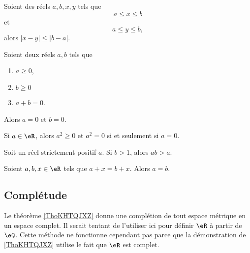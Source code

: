 \begin{lemma}        \label{LEMooEGYLooCGrDrl}
	Soient des réels \( a,b,x,y\) tels que
	\begin{equation}
		a\leq x\leq b
	\end{equation}
	et
	\begin{equation}
		a\leq y\leq b,
	\end{equation}
	alors \( | x-y |\leq | b-a |\).
\end{lemma}

\begin{lemma}       \label{LEMooTPLUooXiCZHJ}
	Soient deux réels \( a,b\) tels que
	\begin{enumerate}
		\item
		      \( a\geq 0\),
		\item
		      \( b\geq 0\)
		\item
		      \( a+b=0\).
	\end{enumerate}
	Alors \( a=0\) et \( b=0\).
\end{lemma}

\begin{lemma}       \label{LEMooNLGSooSGdvAo}
	Si \( a\in \eR\), alors \( a^2\geq 0\) et \( a^2=0\) si et seulement si \( a=0\).
\end{lemma}

\begin{lemma}       \label{LEMooVXAXooNhxtSU}
	Soit un réel strictement positif \( a\). Si \( b>1\), alors \( ab>a\).
\end{lemma}


\begin{lemma}       \label{LEMooFQMVooDNaTDT}
    Soient \( a,b,x\in \eR\) tels que \( a+x=b+x\). Alors \( a=b\).
\end{lemma}


\subsection{Complétude}

Le théorème \ref{ThoKHTQJXZ} donne une complétion de tout espace métrique en un espace complet. Il serait tentant de l'utiliser ici pour définir \( \eR\) à partir de \( \eQ\). Cette méthode ne fonctionne cependant pas parce que la démonstration de \ref{ThoKHTQJXZ} utilise le fait que \( \eR\) est complet.

